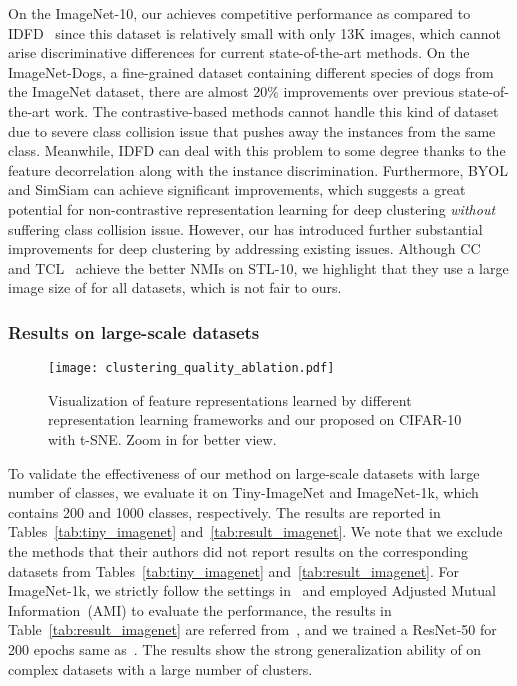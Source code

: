 On the ImageNet-10, our \methodname achieves competitive performance as compared to IDFD~\cite{tao2021clustering} since this dataset is relatively small with only 13K images, which cannot arise discriminative differences for current state-of-the-art methods. On the ImageNet-Dogs, a fine-grained dataset containing different species of dogs from the ImageNet dataset, there are almost 20\% improvements over previous state-of-the-art work. The contrastive-based methods cannot handle this kind of dataset due to severe class collision issue that pushes away the instances from the same class. Meanwhile, IDFD can deal with this problem to some degree thanks to the feature decorrelation along with the instance discrimination.
Furthermore, BYOL and SimSiam can achieve significant improvements, which suggests a great potential for non-contrastive representation learning for deep clustering \emph{without} suffering class collision issue. However, our \methodname has introduced further substantial improvements for deep clustering by addressing existing issues. Although CC~\cite{li2021contrastive} and TCL~\cite{li2022twin} achieve the better NMIs on STL-10, we highlight that they use a large image size of  for all datasets, which is not fair to ours.

\subsubsection{Results on large-scale datasets}


\begin{figure*}[t]
  \centering
  \texttt{[image: clustering\_quality\_ablation.pdf]}
  \caption{
    Visualization of feature representations learned by different representation learning frameworks and our proposed \methodname on CIFAR-10 with t-SNE. Zoom in for better view.
  }
  \label{fig:clustering_quality_ablation}
\end{figure*}

To validate the effectiveness of our method on large-scale datasets with large number of classes, we evaluate it on Tiny-ImageNet and ImageNet-1k, which contains 200 and 1000 classes, respectively. The results are reported in Tables~\ref{tab:tiny_imagenet} and~\ref{tab:result_imagenet}.
We note that we exclude the methods that their authors did not report results on the corresponding datasets from Tables~\ref{tab:tiny_imagenet} and~\ref{tab:result_imagenet}.
For ImageNet-1k, we strictly follow the settings in~\cite{li2020prototypical} and employed Adjusted Mutual Information~(AMI) to evaluate the performance, the results in Table~\ref{tab:result_imagenet} are referred from~\cite{li2020prototypical}, and we trained a ResNet-50 for 200 epochs same as~\cite{li2020prototypical}. The results show the strong generalization ability of \methodname on complex datasets with a large number of clusters.

